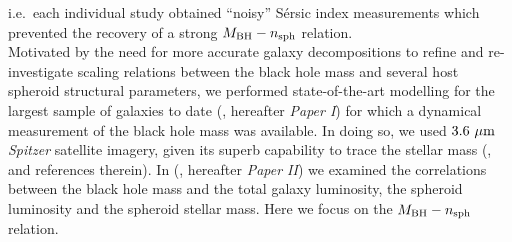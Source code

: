 \documentclass[preprint2]{emulateapj}
\begin{document}
i.e.~each individual study obtained ``noisy'' S\'ersic index measurements 
which prevented the recovery of a strong $M_{\rm BH} - n_{\rm sph}$ relation. \\
Motivated by the need for more accurate galaxy decompositions to refine and re-investigate scaling relations 
between the black hole mass and several host spheroid structural parameters, 
we performed state-of-the-art modelling for the largest sample of galaxies to date (\citealt{paperI}, hereafter \emph{Paper I})  
for which a dynamical measurement of the black hole mass was available.
In doing so, we used $3.6\rm~\mu m$ \emph{Spitzer} satellite imagery, 
given its superb capability to trace the stellar mass (\citealt{sheth2010}, and references therein). 
In \citeauthor{paperII} (\citeyear{paperII}, hereafter \emph{Paper II}) we examined the correlations between the black hole mass and 
the total galaxy luminosity, the spheroid luminosity and the spheroid stellar mass. 
Here we focus on the $M_{\rm BH} - n_{\rm sph}$ relation. 
\end{document}
